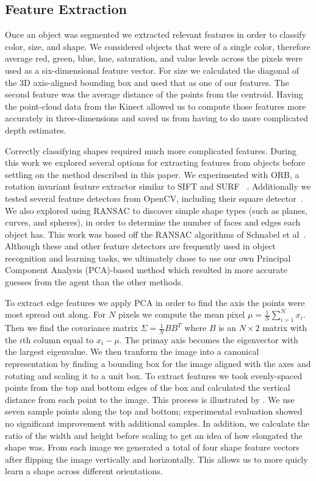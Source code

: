 \documentclass[11pt]{article}
\begin{document}
\subsection{Feature Extraction}

Once an object was segmented we extracted relevant features in order to classify
color, size, and shape. We considered objects that were of a single color, therefore
average red, green, blue, hue, saturation, and value levels across the pixels were
used as a six-dimensional feature vector. For size we calculated the diagonal of the 3D
axis-aligned bounding box and used that as one of our features. The second feature was
the average distance of the points from the centroid. Having the point-cloud data from
the Kinect allowed us to compute those features more accurately in three-dimensions
and saved us from having to do more complicated depth estimates.

Correctly classifying shapes required much more complicated features.
During this work we explored several options for extracting features from
objects before settling on the method described in this paper. We experimented
with ORB, a rotation invariant feature extractor similar to SIFT and SURF
~\cite{rublee2011orb}. Additionally we tested several feature detectors from
OpenCV, including their square detector~\cite{opencv_library}. We also explored
using RANSAC to discover simple shape types (such as planes, curves, and spheres),
in order to determine the number of faces and edges each object has. This work
was based off the RANSAC algorithms of Schnabel et
al~\cite{schnabel2007efficient}. Although these and other feature detectors are
frequently used in object recognition and learning tasks, we ultimately chose to
use our own Principal Component Analysis (PCA)-based method which resulted in more accurate guesses from the
agent than the other methods.

To extract edge features we apply PCA in order to find the axis the points were most spread out along.
For $N$ pixels we compute the mean pixel $\mu = \frac{1}{N}\displaystyle\sum_{i=1}^{N}x_i$. Then we find the covariance matrix $\Sigma = \frac{1}{N} BB^T$ where $B$ is an $N\times 2$ matrix with the $i$th column equal to $x_i - \mu$. The primay axis becomes the eigenvector with the largest eigenvalue. We then tranform the image into a canonical representation by finding a bounding box for the image aligned with the axes and rotating and scaling it to a unit box. To extract features we took evenly-spaced
points from the top and bottom edges of the box and calculated the vertical distance
from each point to the image. This process is illustrated by . We use seven
sample points along the top and bottom; experimental evaluation showed no significant
improvement with additional samples. In addition, we calculate the ratio of the width
and height before scaling to get an idea of how elongated the shape was. From each image we generated a total of four shape feature vectors after flipping the image vertically and horizontally. This allows us to more quicly learn a shape across different orientations. 
\end{document}
